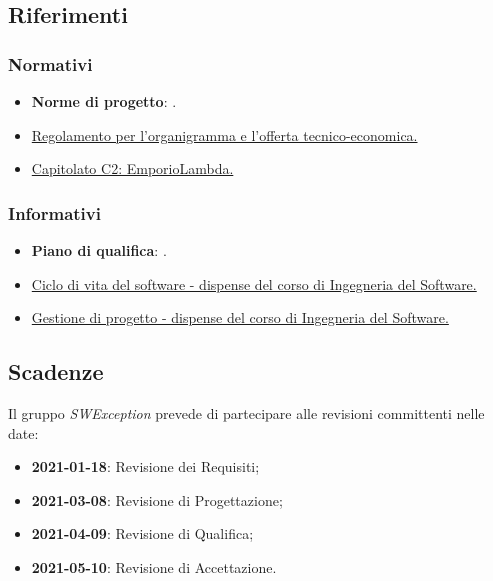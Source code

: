 \subsection{Riferimenti}

\subsubsection{Normativi}
\begin{itemize}
    \item \textbf{Norme di progetto}: .
    \item \href{https://www.math.unipd.it/~tullio/IS-1/2020/Progetto/RO.html}{Regolamento per l'organigramma e l'offerta tecnico-economica.}
    \item \href{https://www.math.unipd.it/~tullio/IS-1/2020/Progetto/C2.pdf}{Capitolato C2: EmporioLambda.}
\end{itemize}

\subsubsection{Informativi}
\begin{itemize}
    \item \textbf{Piano di qualifica}: .
    \item \href{https://www.math.unipd.it/~tullio/IS-1/2020/Dispense/L05.pdf}{Ciclo di vita del software - dispense del corso di Ingegneria del Software.}
    \item \href{https://www.math.unipd.it/~tullio/IS-1/2020/Dispense/L05.pdf}{Gestione di progetto - dispense del corso di Ingegneria del Software.}
\end{itemize}

\subsection{Scadenze}
Il gruppo \textit{SWException} prevede di partecipare alle revisioni committenti nelle date:
\begin{itemize}
    \item \textbf{2021-01-18}: Revisione dei Requisiti;
    \item \textbf{2021-03-08}: Revisione di Progettazione;
    \item \textbf{2021-04-09}: Revisione di Qualifica;
    \item \textbf{2021-05-10}: Revisione di Accettazione.
\end{itemize}